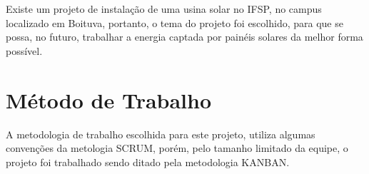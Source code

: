 Existe um projeto de instalação de uma usina solar no IFSP, no campus localizado em Boituva, portanto, o tema do projeto foi escolhido, para que se possa, no futuro, trabalhar a energia captada por painéis solares da melhor forma possível.

\section{Método de Trabalho}

A metodologia de trabalho escolhida para este projeto, utiliza algumas convenções da metologia SCRUM, porém, pelo tamanho limitado da equipe, o projeto foi trabalhado sendo ditado pela metodologia KANBAN.
